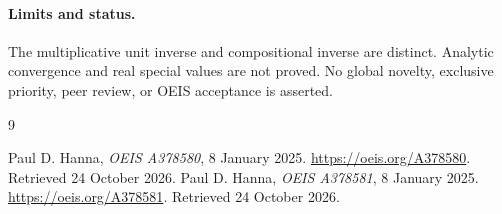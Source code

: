 \documentclass[11pt,a4paper]{article}
\theoremstyle{remark}
\begin{document}
\paragraph{Limits and status.}
The multiplicative unit inverse and compositional inverse are distinct. Analytic convergence and real special values are not proved.
No global novelty, exclusive priority, peer review, or OEIS acceptance is asserted.

\begin{thebibliography}{9}
\raggedright
{}
Paul D. Hanna, \emph{OEIS A378580}, 8 January 2025.
\url{https://oeis.org/A378580}. Retrieved 24 October 2026.
Paul D. Hanna, \emph{OEIS A378581}, 8 January 2025.
\url{https://oeis.org/A378581}. Retrieved 24 October 2026.
\end{thebibliography}
\end{document}
